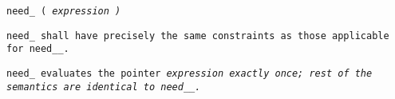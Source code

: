 
\tt{need_ (} \it{expression} \tt{)}


\tt{need_} shall have precisely the same
constraints as those applicable for \tt{need__}.


\tt{need_} evaluates the pointer \it{expression} exactly once;
rest of the semantics are identical to \tt{need__}.
